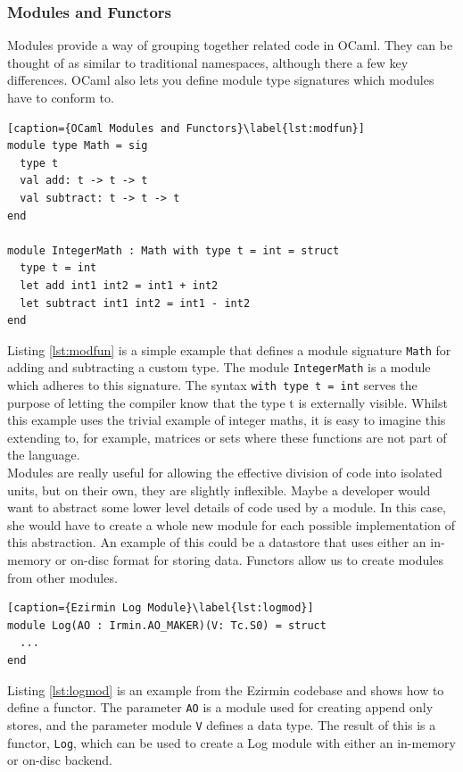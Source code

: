 \documentclass[12pt,a4paper,twoside,openright]{report}
\begin{document}
		\subsubsection*{Modules and Functors}
		Modules provide a way of grouping together related code in OCaml.
		They can be thought of as similar to traditional namespaces, although there a few key differences.
		OCaml also lets you define module type signatures which modules have to conform to.
		\begin{lstlisting}[caption={OCaml Modules and Functors}\label{lst:modfun}]
module type Math = sig
  type t
  val add: t -> t -> t
  val subtract: t -> t -> t
end

module IntegerMath : Math with type t = int = struct 
  type t = int
  let add int1 int2 = int1 + int2
  let subtract int1 int2 = int1 - int2
end
		\end{lstlisting}
		Listing \ref{lst:modfun} is a simple example that defines a module signature \texttt{Math} for adding and subtracting a custom type.
		The module \texttt{IntegerMath} is a module which adheres to this signature. 
		The syntax \texttt{with type t = int} serves the purpose of letting the compiler know that the type t is externally visible.
		Whilst this example uses the trivial example of integer maths, it is easy to imagine this extending to, for example, matrices or sets where these functions are not part of the language.\\

		Modules are really useful for allowing the effective division of code into isolated units, but on their own, they are slightly inflexible. 
		Maybe a developer would want to abstract some lower level details of code used by a module.
		In this case, she would have to create a whole new module for each possible implementation of this abstraction.
		An example of this could be a datastore that uses either an in-memory or on-disc format for storing data.
		Functors allow us to create modules from other modules.
		\begin{lstlisting}[caption={Ezirmin Log Module}\label{lst:logmod}]
module Log(AO : Irmin.AO_MAKER)(V: Tc.S0) = struct
  ...
end
		\end{lstlisting}
		Listing \ref{lst:logmod} is an example from the Ezirmin codebase and shows how to define a functor.
		The parameter \texttt{AO} is a module used for creating append only stores, and the parameter module \texttt{V} defines a data type.
		The result of this is a functor, \texttt{Log}, which can be used to create a Log module with either an in-memory or on-disc backend.
\end{document}
